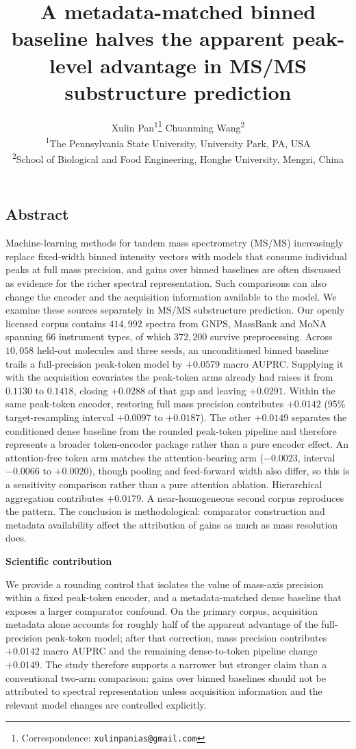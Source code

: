 \documentclass[11pt]{article}
\title{\vspace{-2em}\bfseries A metadata-matched binned baseline halves the apparent peak-level advantage in MS/MS substructure prediction}
\author{Xulin Pan\textsuperscript{1}\thanks{Correspondence: \texttt{xulinpanias@gmail.com}}
\quad Chuanming Wang\textsuperscript{2}\\[4pt]
\small \textsuperscript{1}The Pennsylvania State University, University Park, PA, USA\\
\small \textsuperscript{2}School of Biological and Food Engineering, Honghe University, Mengzi, China}
\date{}
\newcommand{\hd}[1]{\medskip\par\noindent\textbf{#1}\par\nobreak\vspace{2pt}\noindent\ignorespaces}
\begin{document}
\maketitle

\subsection*{Abstract}
\small
Machine-learning methods for tandem mass spectrometry (MS/MS) increasingly replace fixed-width binned intensity vectors with models that consume individual peaks at full mass precision, and gains over binned baselines are often discussed as evidence for the richer spectral representation. Such comparisons can also change the encoder and the acquisition information available to the model. We examine these sources separately in MS/MS substructure prediction. Our openly licensed corpus contains $414{,}992$ spectra from GNPS, MassBank and MoNA spanning $66$ instrument types, of which $372{,}200$ survive preprocessing. Across $10{,}058$ held-out molecules and three seeds, an unconditioned binned baseline trails a full-precision peak-token model by $+0.0579$ macro AUPRC. Supplying it with the acquisition covariates the peak-token arms already had raises it from $0.1130$ to $0.1418$, closing $+0.0288$ of that gap and leaving $+0.0291$. Within the same peak-token encoder, restoring full mass precision contributes $+0.0142$ (95\% target-resampling interval $+0.0097$ to $+0.0187$). The other $+0.0149$ separates the conditioned dense baseline from the rounded peak-token pipeline and therefore represents a broader token-encoder package rather than a pure encoder effect. An attention-free token arm matches the attention-bearing arm ($-0.0023$, interval $-0.0066$ to $+0.0020$), though pooling and feed-forward width also differ, so this is a sensitivity comparison rather than a pure attention ablation. Hierarchical aggregation contributes $+0.0179$. A near-homogeneous second corpus reproduces the pattern. The conclusion is methodological: comparator construction and metadata availability affect the attribution of gains as much as mass resolution does.
\normalsize

\hd{Scientific contribution}
\small
We provide a rounding control that isolates the value of mass-axis precision within a fixed peak-token encoder, and a metadata-matched dense baseline that exposes a larger comparator confound. On the primary corpus, acquisition metadata alone accounts for roughly half of the apparent advantage of the full-precision peak-token model; after that correction, mass precision contributes $+0.0142$ macro AUPRC and the remaining dense-to-token pipeline change $+0.0149$. The study therefore supports a narrower but stronger claim than a conventional two-arm comparison: gains over binned baselines should not be attributed to spectral representation unless acquisition information and the relevant model changes are controlled explicitly.
\normalsize
\end{document}
